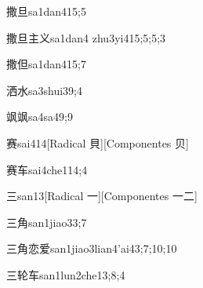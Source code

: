 
\begin{verbete}{撒旦}{sa1dan4}{15;5}
\end{verbete}

\begin{verbete}{撒旦主义}{sa1dan4 zhu3yi4}{15;5;5;3}
\end{verbete}

\begin{verbete}{撒但}{sa1dan4}{15;7}
\end{verbete}

\begin{verbete}{洒水}{sa3shui3}{9;4}
\end{verbete}

\begin{verbete}{飒飒}{sa4sa4}{9;9}
\end{verbete}

\begin{verbete}{赛}{sai4}{14}[Radical 貝][Componentes 贝]
\end{verbete}

\begin{verbete}{赛车}{sai4che1}{14;4}
\end{verbete}

\begin{verbete}{三}{san1}{3}[Radical 一][Componentes 一二]
\end{verbete}

\begin{verbete}{三角}{san1jiao3}{3;7}
\end{verbete}

\begin{verbete}{三角恋爱}{san1jiao3lian4'ai4}{3;7;10;10}
\end{verbete}

\begin{verbete}{三轮车}{san1lun2che1}{3;8;4}
\end{verbete}

